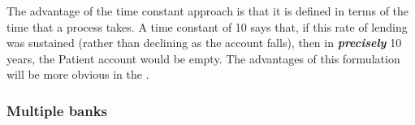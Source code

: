 \begin{center}
\end{center}


The advantage of the time constant approach is that it is defined in
terms of the time that a process takes. A time constant of 10 says
that, if this rate of lending was sustained (rather than declining as
the account falls), then in {\bf\em precisely} 10 years, the Patient account
would be empty. The advantages of this formulation will be more
obvious in the .


\subsubsection{Multiple banks}

